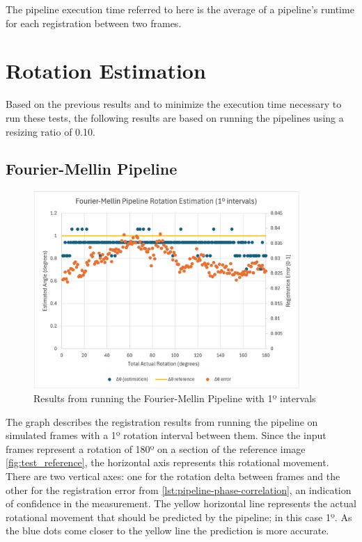 The pipeline execution time referred to here is the average of a pipeline's runtime for each registration between two frames.

\section{Rotation Estimation}

Based on the previous results and to minimize the execution time necessary to run these tests, the following results are based on running the pipelines using a resizing ratio of 0.10.

\subsection{Fourier-Mellin Pipeline}

\begin{figure}[H]
  \centering
  \includegraphics[width=0.9\textwidth]{figures/results/Rotation-Graphs/FMT-1.png}
  \caption{Results from running the Fourier-Mellin Pipeline with 1º intervals}
  \label{fig:fmresults-skip-0}
\end{figure}

The graph describes the registration results from running the pipeline on simulated frames with a 1º rotation interval between them. Since the input frames represent a rotation of 180º on a section of the reference image \autoref{fig:test_reference}, the horizontal axis represents this rotational movement. There are two vertical axes: one for the rotation delta between frames and the other for the registration error from \autoref{lst:pipeline-phase-correlation}, an indication of confidence in the measurement. The yellow horizontal line represents the actual rotational movement that should be predicted by the pipeline; in this case 1º. As the blue dots come closer to the yellow line the prediction is more accurate. 

